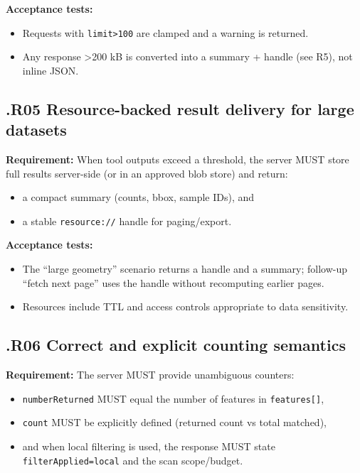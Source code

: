\textbf{Acceptance tests:}
\begin{itemize}[leftmargin=*]
\item Requests with \texttt{limit>100} are clamped and a warning is returned.
\item Any response >200 kB is converted into a summary + handle (see R5), not inline JSON.
\end{itemize}

\subsection*{\thesection.R05 Resource-backed result delivery for large datasets}
\textbf{Requirement:} When tool outputs exceed a threshold, the server MUST store full results server-side (or in an approved blob store) and return: \cite{mcp_spec_2025_11_25,owasp_llm_top10}
\begin{itemize}[leftmargin=*]
\item a compact summary (counts, bbox, sample IDs), and
\item a stable \texttt{resource://} handle for paging/export.
\end{itemize}

\textbf{Acceptance tests:}
\begin{itemize}[leftmargin=*]
\item The “large geometry” scenario returns a handle and a summary; follow-up “fetch next page” uses the handle without recomputing earlier pages.
\item Resources include TTL and access controls appropriate to data sensitivity.
\end{itemize}

\subsection*{\thesection.R06 Correct and explicit counting semantics}
\textbf{Requirement:} The server MUST provide unambiguous counters: \cite{algorithmic_transparency_recording_standard,prov_dm}
\begin{itemize}[leftmargin=*]
\item \texttt{numberReturned} MUST equal the number of features in \texttt{features[]},
\item \texttt{count} MUST be explicitly defined (returned count vs total matched),
\item and when local filtering is used, the response MUST state \texttt{filterApplied=local} and the scan scope/budget.
\end{itemize}


